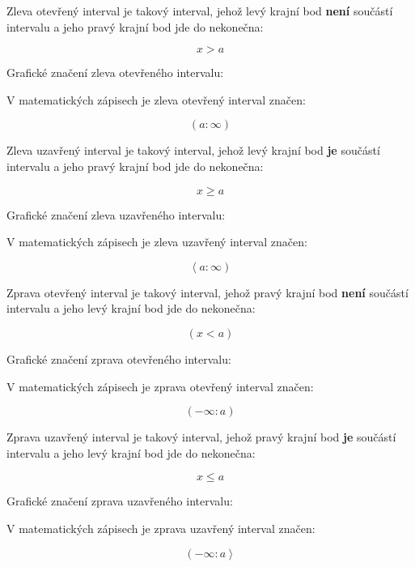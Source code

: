 Zleva otevřený interval je takový interval, jehož levý krajní bod {\bf není} součástí intervalu a jeho pravý krajní bod jde do nekonečna:

$$ x > a $$

Grafické značení zleva otevřeného intervalu:

\vskip 4mm
\centerline{}
\vskip 4mm

V matematických zápisech je zleva otevřený interval značen:

$$ \left( a:\infty \right) $$


Zleva uzavřený interval je takový interval, jehož levý krajní bod {\bf je} součástí intervalu a jeho pravý krajní bod jde do nekonečna:

$$ x \geq a $$

Grafické značení zleva uzavřeného intervalu:

\vskip 4mm
\centerline{}
\vskip 4mm

V matematických zápisech je zleva uzavřený interval značen:

$$ \left< a:\infty \right) $$


Zprava otevřený interval je takový interval, jehož pravý krajní bod {\bf není} součástí intervalu a jeho levý krajní bod jde do nekonečna:

$$ \left( x < a \right) $$

Grafické značení zprava otevřeného intervalu:

\vskip 4mm
\centerline{}
\vskip 4mm

V matematických zápisech je zprava otevřený interval značen:

$$ \left( -\infty : a \right) $$


Zprava uzavřený interval je takový interval, jehož pravý krajní bod {\bf je} součástí intervalu a jeho levý krajní bod jde do nekonečna:

$$ x \leq a $$

Grafické značení zprava uzavřeného intervalu:

\vskip 4mm
\centerline{}
\vskip 4mm

V matematických zápisech je zprava uzavřený interval značen:

$$ \left( -\infty : a \right> $$



